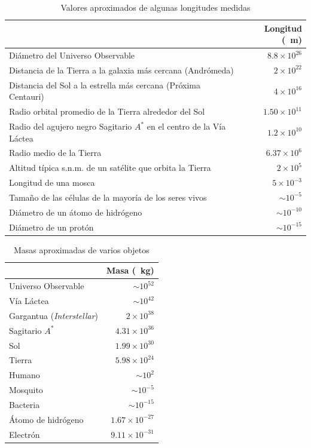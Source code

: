 \begin{table}[ht]
\caption{Valores aproximados de algunas longitudes medidas}
\begin{tabular}{l r}
\toprule
           & \textbf{Longitud (\SI{}{\meter})} \\
\midrule
Di\'ametro del Universo Observable & $8.8\times10^{26}$\\
Distancia de la Tierra a la galaxia m\'as cercana (Andr\'omeda) & $2\times10^{22}$\\
Distancia del Sol a la estrella m\'as cercana (Pr\'oxima Centauri)  &  $4\times10^{16}$  \\
Radio orbital promedio de la Tierra alrededor del Sol &  $1.50\times10^{11}$ \\
Radio del agujero negro Sagitario $A^*$ en el centro de la V\'ia L\'actea & $1.2\times10^{10}$\\
Radio medio de la Tierra & $6.37\times10^{6}$\\
Altitud t\'ipica s.n.m. de un sat\'elite que orbita la Tierra & $2\times 10^5$\\
Longitud de una mosca & $5\times10^{-3}$\\
Tama\~no de las c\'elulas de la mayor\'ia de los seres vivos & $\sim10^{-5}$ \\
Di\'ametro de un \'atomo de hidr\'ogeno & $\sim10^{-10}$\\
Di\'ametro de un prot\'on & $\sim10^{-15}$\\
\bottomrule
\end{tabular}
\label{table:distancias1}
\end{table}

\begin{table}[t]
\caption{Masas aproximadas de varios objetos}
\begin{tabular}{l r}
\toprule
           & \textbf{Masa (\SI{}{\kilogram})} \\
\midrule
Universo Observable & $\sim10^{52}$\\
V\'ia L\'actea & $\sim10^{42}$\\
Gargantua (\emph{Interstellar})  &  $2\times10^{38}$  \\
Sagitario $A^*$ &  $4.31\times10^{36}$ \\
Sol & $1.99\times10^{30}$\\
Tierra & $5.98\times10^{24}$\\
Humano & $\sim 10^2$\\
Mosquito & $\sim10^{-5}$\\
Bacteria & $\sim10^{-15}$ \\
\'Atomo de hidr\'ogeno & $1.67\times10^{-27}$\\
Electr\'on & $9.11\times10^{-31}$\\
\bottomrule
\end{tabular}
\label{table:masas1}
\end{table}


